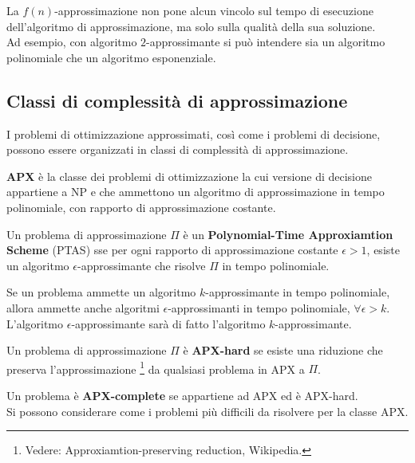 \begin{rem}
    La $f(n)$-approssimazione non pone alcun vincolo sul tempo di esecuzione
    dell'algoritmo di approssimazione, ma solo sulla qualità della sua
    soluzione.\\
    Ad esempio, con algoritmo $2$-approssimante si può intendere sia un
    algoritmo polinomiale che un algoritmo esponenziale.
\end{rem}

\subsection*{Classi di complessità di approssimazione}
I problemi di ottimizzazione approssimati, così come i problemi di decisione,
possono essere organizzati in classi di complessità di approssimazione.

\begin{defn}
    \textbf{APX} è la classe dei problemi di ottimizzazione la cui versione
    di decisione appartiene a NP e che ammettono un algoritmo di
    approssimazione in tempo polinomiale, con rapporto di approssimazione
    costante.
\end{defn}

\begin{defn}
    Un problema di approssimazione $\Pi$ è un
    \textbf{Polynomial-Time Approxiamtion Scheme} (PTAS) sse per ogni rapporto
    di approssimazione costante $\epsilon > 1$, esiste un algoritmo
    $\epsilon$-approssimante che risolve $\Pi$ in tempo polinomiale.
\end{defn}

\begin{rem}
    Se un problema ammette un algoritmo $k$-approssimante in tempo polinomiale,
    allora ammette anche algoritmi $\epsilon$-approssimanti in tempo
    polinomiale, $\forall \epsilon > k$.
    L'algoritmo $\epsilon$-approssimante sarà di fatto l'algoritmo
    $k$-approssimante.
\end{rem}

\begin{defn}
    Un problema di approssimazione $\Pi$ è \textbf{APX-hard} se esiste una
    riduzione che preserva l'approssimazione
    \footnote{Vedere: Approxiamtion-preserving reduction, Wikipedia.}
    da qualsiasi problema in APX a $\Pi$.
\end{defn}

\begin{defn}
    Un problema è \textbf{APX-complete} se appartiene ad APX ed è APX-hard.\\
    Si possono considerare come i problemi più difficili da risolvere per la
    classe APX.
\end{defn}

